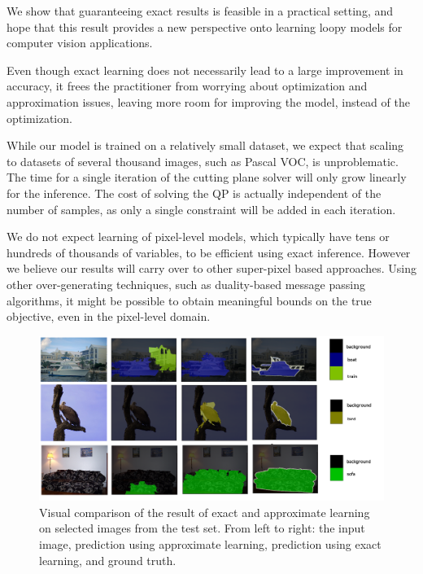 We show that guaranteeing exact results is feasible in a practical setting, and
hope that this result provides a new perspective onto learning loopy models for
computer vision applications.

Even though exact learning does not necessarily lead to a large improvement in
accuracy, it frees the practitioner from worrying about optimization and
approximation issues, leaving more room for improving the model, instead of the
optimization.

While our model is trained on a relatively small dataset, we expect that scaling to
datasets of several thousand images, such as Pascal VOC, is unproblematic.
The time for a single iteration of the cutting plane solver will only grow
linearly for the inference. The cost of solving the QP is actually independent
of the number of samples, as only a single constraint will be added in each
iteration.

We do not expect learning of pixel-level models, which typically have tens or
hundreds of thousands of variables, to be efficient using exact inference. However we
believe our results will carry over to other super-pixel based approaches.
Using other over-generating techniques, such as duality-based message passing
algorithms, it might be possible to obtain meaningful bounds on the true
objective, even in the pixel-level domain.

\begin{figure}
\centering
\includegraphics[width=\linewidth]{figure}
\caption{%
    Visual comparison of the result of exact and approximate learning on
    selected images from the test set.  From left to right: the input image,
    prediction using approximate learning, prediction using exact learning, and
    ground truth.
\label{visual}}
\end{figure}

